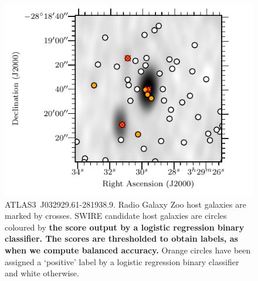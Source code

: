 \documentclass[fleqn,usenatbib,usedcolumn]{mnras}
\newcommand{\edited}[1]{{\bf {#1}}}
\begin{document}
    \begin{figure}
      \centering
      \includegraphics[width=\columnwidth]{images/positives.pdf}
      \caption{ATLAS3~J032929.61-281938.9. Radio Galaxy Zoo host galaxies
      are marked by crosses. SWIRE candidate host galaxies are circles coloured by \edited{the score output by a logistic regression binary classifier. The scores are thresholded to obtain labels, as when we compute balanced accuracy.} Orange circles have been assigned a `positive' label by a logistic regression binary classifier and white otherwise.
      \label{fig:positives}}
    \end{figure}
\end{document}
